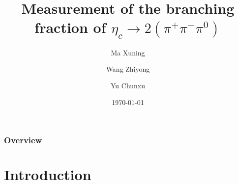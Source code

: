 \documentclass{beamer}
\title[Measurement of Branching fraction]{Measurement of the branching fraction of $\eta_c\to 2(\pi^+\pi^-\pi^0)$}
\author{Ma Xuning \inst{1} \and Wang Zhiyong\inst{2} \and Yu Chunxu \inst{1}}
\institute[]{\inst{1} Nankai Univ. \and \inst{2} IHEP}
\date{\today}
\begin{document}
\begin{frame}
    \titlepage 
\end{frame}

\begin{frame}
    \frametitle{Overview} 
    \setcounter{tocdepth}{1}
    \tableofcontents 
\end{frame}

\section{Introduction}
\end{document}
